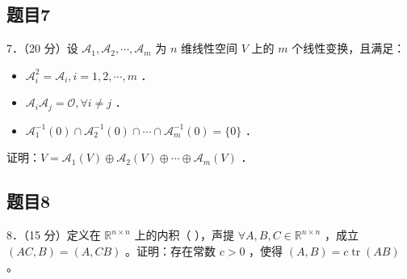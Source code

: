 \documentclass{article}
\begin{document}
\subsection{题目7}
7．（20 分）设 \(\mathcal{A}_{1}, \mathcal{A}_{2}, \cdots, \mathcal{A}_{m}\) 为 \(n\) 维线性空间 \(V\) 上的 \(m\) 个线性变换，且满足：

\begin{itemize}
  \item[（1）] \(\mathcal{A}_{i}^{2}=\mathcal{A}_{i}, i=1,2, \cdots, m\) ．
  \item[（2）] \(\mathcal{A}_{i} \mathcal{A}_{j}=\mathcal{O}, \forall i \neq j\) ．
  \item[（3）] \(\mathcal{A}_{1}^{-1}(0) \cap \mathcal{A}_{2}^{-1}(0) \cap \cdots \cap \mathcal{A}_{m}^{-1}(0)=\{0\}\) ．
\end{itemize}

证明：\(V=\mathcal{A}_{1}(V) \oplus \mathcal{A}_{2}(V) \oplus \cdots \oplus \mathcal{A}_{m}(V)\) ．

\subsection{题目8}
8．（15 分）定义在 \(\mathbb{R}^{n \times n}\) 上的内积（ ），声提 \(\forall A, B, C \in \mathbb{R}^{n \times n}\) ，成立 \((A C, B)=(A, C B)\) 。证明：存在常数 \(c>0\) ，使得 \((A, B)=c \operatorname{tr}(A B)\) 。
\end{document}
